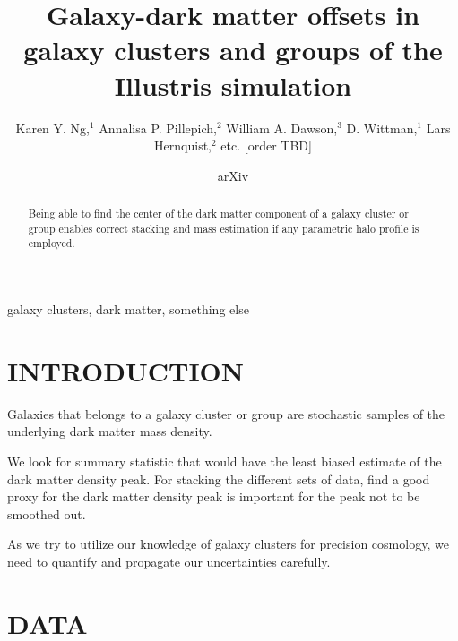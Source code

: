 \documentclass[letterpaper,useAMS,usenatbib]{mn2e}
\title[
	Galaxy-dark matter offsets in galaxy clusters and groups of the
Illustris simulation
]
{Galaxy-dark matter offsets in galaxy clusters and groups of the
Illustris simulation}
\author[Karen Y. Ng et al.]{Karen Y. Ng,$^{1}$
	Annalisa P. Pillepich,$^{2}$ 
	William A. Dawson,$^{3}$ 
	D. Wittman,$^{1}$
	\newauthor Lars Hernquist,$^{2}$
	etc. [order TBD]
}
\begin{document}
\date{arXiv} \pagerange{\pageref{firstpage}--\pageref{lastpage}}
 \maketitle\label{firstpage}
\begin{abstract} 
	Being able to find the center of the dark matter component of a galaxy cluster or
	group enables correct stacking and mass estimation if any parametric halo
	profile is employed. 
\end{abstract}
\begin{keywords}
	galaxy clusters, dark matter, something else 
\end{keywords}
\section{INTRODUCTION} 

Galaxies that belongs to a galaxy cluster or group are stochastic samples
of the underlying dark matter mass density. 

We look for summary statistic that would have the least biased estimate of
the dark matter density peak. For stacking the different sets of data, 
find a good proxy for the dark matter density peak is important for the
peak not to be smoothed out. 

As we try to utilize our knowledge of galaxy clusters for precision cosmology,
we need to quantify and propagate our uncertainties carefully.



\section{DATA}
\end{document}
